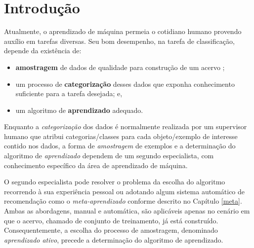 \chapter{Introdução} \label{cap:intro}
Atualmente, o aprendizado de máquina permeia o cotidiano humano
provendo auxílio em tarefas diversas.
Seu bom desempenho, na tarefa de classificação, depende da existência de:
\begin{itemize}
 \item \textbf{amostragem} de dados de qualidade para construção de um acervo ;
 \item um processo de \textbf{categorização} desses dados que exponha conhecimento
 suficiente para a tarefa desejada; e,
 \item um algoritmo de \textbf{aprendizado} adequado.
\end{itemize}
Enquanto a \textit{categorização} dos dados é normalmente
realizada por um supervisor humano que atribui categorias/classes para cada objeto/exemplo
de interesse contido nos dados,
a forma de \textit{amostragem} de exemplos
e a determinação do algoritmo de \textit{aprendizado} dependem de
um segundo especialista,
com conhecimento específico da área de aprendizado de máquina.


O segundo especialista pode resolver o problema da escolha do algoritmo
recorrendo à sua experiência pessoal ou adotando algum sistema automático de
recomendação como o \textit{meta-aprendizado} conforme descrito no
Capítulo \ref{meta}.
Ambas as abordagens, manual e automática,
são aplicáveis apenas no cenário em que o acervo, chamado de conjunto de treinamento,
já está construído.
Consequentemente, a escolha do processo de amostragem,
denominado \textit{aprendizado ativo},
precede a determinação do algoritmo de aprendizado.

